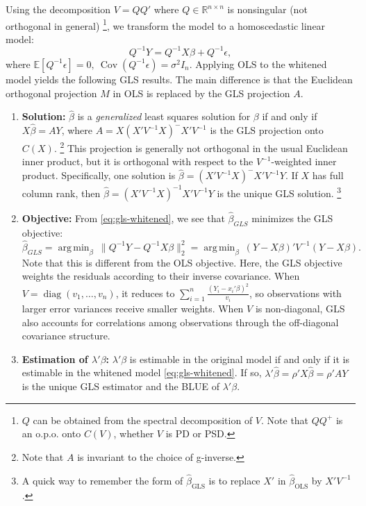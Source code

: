 \documentclass{article}
\theoremstyle{break}
\newcommand{\R}{\ensuremath{\mathbb{R}}}
\newcommand{\E}{\ensuremath{\mathbb{E}}}
\DeclareMathOperator{\Cov}{Cov}
\DeclareMathOperator{\diag}{diag}
\DeclareMathOperator*{\argmin}{arg\,min}
\begin{document}
Using the decomposition $V = QQ'$ where $Q\in \R^{n \times n}$ is nonsingular (not orthogonal in general)
\footnote{$Q$ can be obtained from the spectral decomposition of $V$. Note that $QQ^+$ is an o.p.o. onto $C(V)$, whether $V$ is PD or PSD.}, 
we transform the model to a homoscedastic linear model:
\begin{equation}\label{eq:gls-whitened}
    Q^{-1}Y = Q^{-1}X\beta + Q^{-1} \epsilon,
\end{equation}
where $\E[Q^{-1} \epsilon] = 0,\ \Cov(Q^{-1} \epsilon) = \sigma^2 I_n$.
Applying OLS to the whitened model yields the following GLS results. 
The main difference is that the Euclidean orthogonal projection $M$ in OLS is replaced by the GLS projection $A$.
\begin{enumerate}
    \item \textbf{Solution:} $\hat\beta$ is a \emph{generalized} least squares solution for $\beta$ if and only if $X\hat\beta=AY$, where $A = X(X'V^{-1}X)^- X'V^{-1}$ is the GLS projection onto $C(X)$. 
    \footnote{Note that $A$ is invariant to the choice of g-inverse.}
    This projection is generally not orthogonal in the usual Euclidean inner product, but it is orthogonal with respect to the $V^{-1}$-weighted inner product.
    Specifically, one solution is $\hat\beta = (X'V^{-1}X)^- X'V^{-1}Y$.
    If $X$ has full column rank, then $\hat\beta = (X'V^{-1}X)^{-1} X'V^{-1}Y$ is the unique GLS solution.
    \footnote{A quick way to remember the form of $\hat\beta_{\mathrm{GLS}}$ is to replace $X'$ in $\hat\beta_{\mathrm{OLS}}$ by $X' V^{-1}$.}
    \item \textbf{Objective: } From \eqref{eq:gls-whitened}, we see that $\hat\beta_{GLS}$ minimizes the GLS objective:
    \[
    \hat\beta_{GLS} = \argmin_\beta\ \|Q^{-1} Y - Q^{-1} X \beta\|_2^2 = \argmin_\beta\ (Y-X\beta)'V^{-1}(Y-X\beta).
    \]
    Note that this is different from the OLS objective.
    Here, the GLS objective weights the residuals according to their inverse covariance. When $V=\diag(v_1,\ldots,v_n)$, it reduces to $\sum_{i=1}^n \frac{(Y_i-x_i'\beta)^2}{v_i}$, so observations with larger error variances receive smaller weights. When $V$ is non-diagonal, GLS also accounts for correlations among observations through the off-diagonal covariance structure.
    \item \textbf{Estimation of $\lambda'\beta$:} $\lambda'\beta$ is estimable in the original model if and only if it is estimable in the whitened model \eqref{eq:gls-whitened}. If so, $\lambda'\hat\beta = \rho'X\hat\beta = \rho'AY$ is the unique GLS estimator and the BLUE of $\lambda'\beta$.

\end{enumerate}
\end{document}
